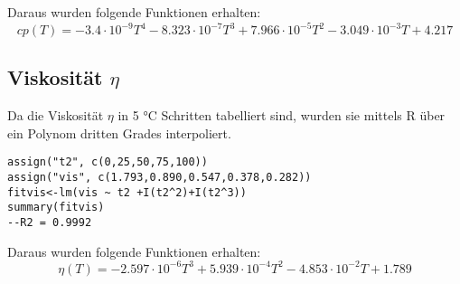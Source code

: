 \documentclass[12pt]{article}
\begin{document}
Daraus wurden folgende Funktionen erhalten:
\begin{equation}
 cp (T) = -3.4 \cdot 10^{-9} T ^4 -8.323 \cdot 10^{-7} T ^ 3 + 7.966 \cdot 10^{-5} T ^ 2 - 3.049 \cdot 10^{-3} T + 4.217
\end{equation}
\subsection{Viskosität $\eta$}
Da die Viskosität $\eta$ \cite{crc2} in 5 \si{\celsius} Schritten
tabelliert sind, wurden sie mittels R über ein Polynom dritten Grades interpoliert.
\begin{verbatim}
assign("t2", c(0,25,50,75,100))
assign("vis", c(1.793,0.890,0.547,0.378,0.282))
fitvis<-lm(vis ~ t2 +I(t2^2)+I(t2^3))
summary(fitvis)
--R2 = 0.9992
\end{verbatim}
Daraus wurden folgende Funktionen erhalten:
\begin{equation}
 \eta (T) = -2.597 \cdot 10^{-6} T ^ 3 + 5.939 \cdot 10^{-4} T ^ 2 - 4.853 \cdot 10^{-2} T + 1.789
\end{equation}
\end{document}
